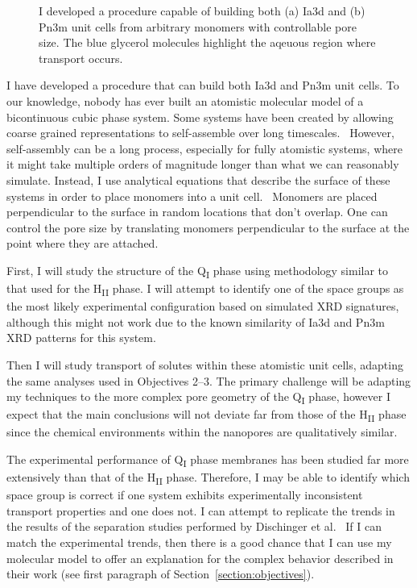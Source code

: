 \documentclass{article}
\begin{document}
\begin{figure}
\begin{subfigure}{0.49\linewidth}
  \caption{}\label{fig:pn3m}
  \end{subfigure}
  \caption{I developed a procedure capable of building both (a) Ia3d and (b) Pn3m
  unit cells from arbitrary monomers with controllable pore size. The blue
  glycerol molecules highlight the aqeuous region where transport occurs.}\label{fig:q1_unitcells}
  \vspace{-0.5cm}
  \end{figure}
  
  I have developed a procedure that can build both Ia3d and Pn3m unit cells.
  To our knowledge, nobody has ever built an atomistic molecular model of 
  a bicontinuous cubic phase system. Some systems have been created by 
  allowing coarse grained representations to self-assemble over long 
  timescales.~\cite{mondal_self-assembly_2013} However, self-assembly
  can be a long process, especially for fully atomistic systems, where it
  might take multiple orders of magnitude longer than what we can 
  reasonably simulate. Instead, I use analytical equations that describe
  the surface of these systems in order to place monomers into a unit cell.~\cite{benedicto_bicontinuous_1997}
  Monomers are placed perpendicular to the surface in random locations 
  that don't overlap. One can control the pore size by translating monomers
  perpendicular to the surface at the point where they are attached.
  
  First, I will study the structure of the Q\textsubscript{I} phase using
  methodology similar to that used for the H\textsubscript{II} phase.
  I will attempt to identify one of the space groups as the most likely
  experimental configuration based on simulated XRD signatures, although
  this might not work due to the known similarity of Ia3d and Pn3m XRD 
  patterns for this system.
  
  Then I will study transport of solutes within these atomistic unit cells, 
  adapting the same analyses used in Objectives 2--3. The primary 
  challenge will be adapting my techniques to the more complex pore geometry
  of the Q\textsubscript{I} phase, however I expect that the main conclusions
  will not deviate far from those of the H\textsubscript{II} phase since
  the chemical environments within the nanopores are qualitatively similar. 
  
  The experimental performance of Q\textsubscript{I} phase membranes has been
  studied far more extensively than that of the H\textsubscript{II} phase. 
  Therefore, I may be able to identify which space group is correct if
  one system exhibits experimentally inconsistent transport properties and one
  does not. I can attempt to replicate the trends in the results of the separation
  studies performed by Dischinger et al.~\cite{dischinger_application_2017} If
  I can match the experimental trends, then there is a good chance that I can
  use my molecular model to offer an explanation for the complex behavior described
  in their work (see first paragraph of Section~\ref{section:objectives}).
\end{document}
